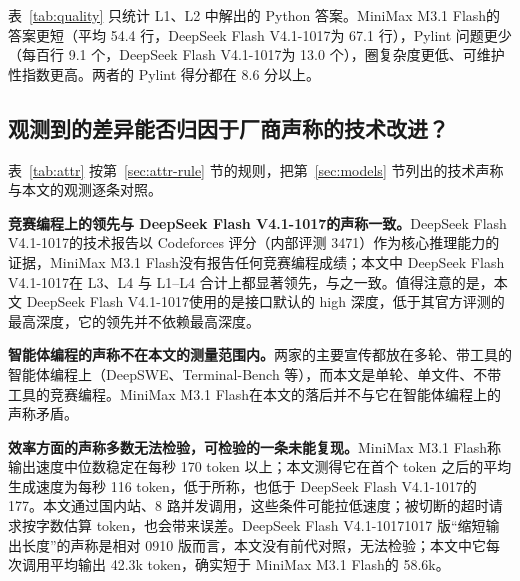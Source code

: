 \documentclass[11pt,a4paper,fontset=none]{ctexart}
\renewcommand{\arraystretch}{1.12}
\newcommand{\ds}{DeepSeek Flash V4.1-1017}
\newcommand{\mini}{MiniMax M3.1 Flash}
\newcommand{\lead}[1]{\textbf{#1}\quad}
\begin{document}
表~\ref{tab:quality} 只统计 L1、L2 中解出的 Python 答案。\mini 的答案更短（平均 54.4 行，\ds 为 67.1 行），Pylint 问题更少（每百行 9.1 个，\ds 为 13.0 个），圈复杂度更低、可维护性指数更高。两者的 Pylint 得分都在 8.6 分以上。

\begin{table}[!tbp]
  \centering
  \caption{\textbf{静态代码质量（L1、L2 中解出的 Python 答案，每份平均）。}较好者加粗；SLOC 只作描述。}
  \label{tab:quality}
  \small
  \begin{adjustbox}{max width=\linewidth}\end{adjustbox}
\end{table}

\subsection{观测到的差异能否归因于厂商声称的技术改进？}
\label{sec:attr}

表~\ref{tab:attr} 按第~\ref{sec:attr-rule} 节的规则，把第~\ref{sec:models} 节列出的技术声称与本文的观测逐条对照。

\begin{table}[!tbp]
  \centering
  \caption{\textbf{厂商声称与本文观测的对照。}差值为 \ds 减去 \mini，方括号内为配对 bootstrap 的 95\% 区间；“一致”只表示观测与声称不矛盾，不表示因果。}
  \label{tab:attr}
  \footnotesize
  \renewcommand{\arraystretch}{1.05}\setlength{\tabcolsep}{4pt}
  
\end{table}

\lead{竞赛编程上的领先与 \ds 的声称一致。}\ds 的技术报告以 Codeforces 评分（内部评测 3471）作为核心推理能力的证据，\mini 没有报告任何竞赛编程成绩；本文中 \ds 在 L3、L4 与 L1--L4 合计上都显著领先，与之一致。值得注意的是，本文 \ds 使用的是接口默认的 high 深度，低于其官方评测的最高深度，它的领先并不依赖最高深度。

\lead{智能体编程的声称不在本文的测量范围内。}两家的主要宣传都放在多轮、带工具的智能体编程上（DeepSWE、Terminal-Bench 等），而本文是单轮、单文件、不带工具的竞赛编程。\mini 在本文的落后并不与它在智能体编程上的声称矛盾。

\lead{效率方面的声称多数无法检验，可检验的一条未能复现。}\mini 称输出速度中位数稳定在每秒 170 token 以上；本文测得它在首个 token 之后的平均生成速度为每秒 116 token，低于所称，也低于 \ds 的 177。本文通过国内站、8 路并发调用，这些条件可能拉低速度；被切断的超时请求按字数估算 token，也会带来误差。\ds 1017 版“缩短输出长度”的声称是相对 0910 版而言，本文没有前代对照，无法检验；本文中它每次调用平均输出 42.3k token，确实短于 \mini 的 58.6k。
\end{document}
